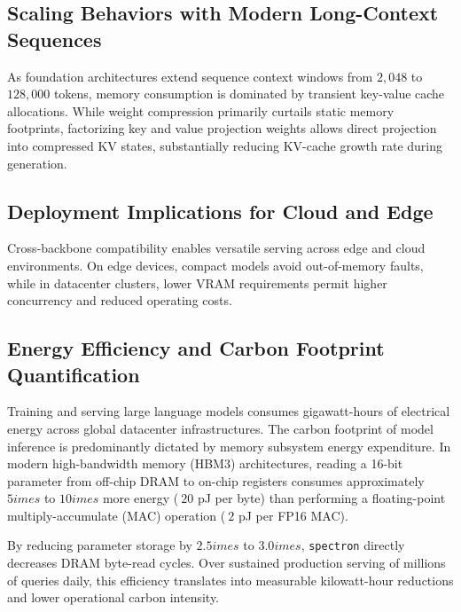 \subsection{Scaling Behaviors with Modern Long-Context Sequences}
As foundation architectures extend sequence context windows from $2{,}048$ to $128{,}000$ tokens, memory consumption is dominated by transient key-value cache allocations. While weight compression primarily curtails static memory footprints, factorizing key and value projection weights allows direct projection into compressed KV states, substantially reducing KV-cache growth rate during generation.

\subsection{Deployment Implications for Cloud and Edge}
Cross-backbone compatibility enables versatile serving across edge and cloud environments. On edge devices, compact models avoid out-of-memory faults, while in datacenter clusters, lower VRAM requirements permit higher concurrency and reduced operating costs.

\subsection{Energy Efficiency and Carbon Footprint Quantification}
Training and serving large language models consumes gigawatt-hours of electrical energy across global datacenter infrastructures. The carbon footprint of model inference is predominantly dictated by memory subsystem energy expenditure. In modern high-bandwidth memory (HBM3) architectures, reading a 16-bit parameter from off-chip DRAM to on-chip registers consumes approximately $5	imes$ to $10	imes$ more energy ($~20$ pJ per byte) than performing a floating-point multiply-accumulate (MAC) operation ($~2$ pJ per FP16 MAC).

By reducing parameter storage by $2.5	imes$ to $3.0	imes$, \texttt{spectron} directly decreases DRAM byte-read cycles. Over sustained production serving of millions of queries daily, this efficiency translates into measurable kilowatt-hour reductions and lower operational carbon intensity.

